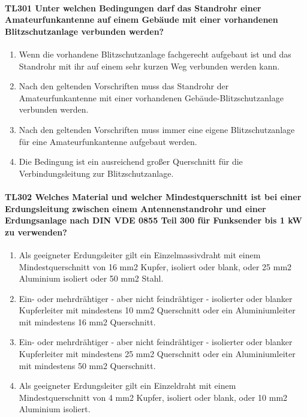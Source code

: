 \documentclass[8pt]{article}
\begin{document}
\paragraph*{TL301 Unter welchen Bedingungen darf das Standrohr einer Amateurfunkantenne auf einem Gebäude mit einer vorhandenen Blitzschutzanlage verbunden werden?}
\begin{enumerate}[nolistsep,label=\Alph*]
\item Wenn die vorhandene Blitzschutzanlage fachgerecht aufgebaut ist und das Standrohr mit ihr auf einem sehr kurzen Weg verbunden werden kann.
\item Nach den geltenden Vorschriften muss das Standrohr der Amateurfunkantenne mit einer vorhandenen Gebäude-Blitzschutzanlage verbunden werden.
\item Nach den geltenden Vorschriften muss immer eine eigene Blitzschutzanlage für eine Amateurfunkantenne aufgebaut werden.
\item Die Bedingung ist ein ausreichend großer Querschnitt für die Verbindungsleitung zur Blitzschutzanlage.
\end{enumerate}

\paragraph*{TL302 Welches Material und welcher Mindestquerschnitt ist bei einer Erdungsleitung zwischen einem Antennenstandrohr und einer Erdungsanlage nach DIN VDE 0855 Teil 300 für Funksender bis 1 kW zu verwenden?} 
\begin{enumerate}[nolistsep,label=\Alph*]
\item Als geeigneter Erdungsleiter gilt ein Einzelmassivdraht mit einem Mindestquerschnitt von 16 mm2 Kupfer, isoliert oder blank, oder 25 mm2 Aluminium isoliert oder 50 mm2 Stahl.
\item Ein- oder mehrdrähtiger - aber nicht feindrähtiger - isolierter oder blanker Kupferleiter mit mindestens 10 mm2 Querschnitt oder ein Aluminiumleiter mit mindestens 16 mm2 Querschnitt. 
\item Ein- oder mehrdrähtiger - aber nicht feindrähtiger - isolierter oder blanker Kupferleiter mit mindestens 25 mm2 Querschnitt oder ein Aluminiumleiter mit mindestens 50 mm2 Querschnitt.
\item Als geeigneter Erdungsleiter gilt ein Einzeldraht mit einem Mindestquerschnitt von 4 mm2 Kupfer, isoliert oder blank, oder 10 mm2 Aluminium isoliert.
\end{enumerate}
\end{document}
